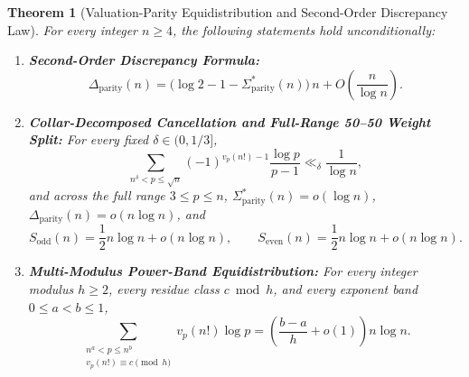 \documentclass[11pt,reqno]{amsart}
\newtheorem{theorem}{Theorem}[section]
\theoremstyle{remark}
\numberwithin{equation}{section}
\newcommand{\Sodd}{S_{\mathrm{odd}}}
\newcommand{\Seven}{S_{\mathrm{even}}}
\newcommand{\Dparity}{\Delta_{\mathrm{parity}}}
\newcommand{\Sparitys}{\Sigma_{\mathrm{parity}}^*}
\begin{document}
\begin{theorem}[{Valuation-Parity Equidistribution and Second-Order Discrepancy Law}]\label{thm:2.5}
For every integer $n \ge 4$, the following statements hold unconditionally:
\begin{enumerate}
\item[(i)] \textbf{Second-Order Discrepancy Formula:}
\begin{equation}\label{eq:2.15}
\Dparity(n) = \bigl(\log 2 - 1 - \Sparitys(n)\bigr)\,n + O\!\left(\frac{n}{\log n}\right).
\end{equation}
\item[(ii)] \textbf{Collar-Decomposed Cancellation and Full-Range 50--50 Weight Split:} For every fixed $\delta \in (0, 1/3]$,
\begin{equation}\label{eq:2.16}
\sum_{n^\delta < p \le \sqrt{n}} (-1)^{v_p(n!)-1} \frac{\log p}{p - 1} \ll_\delta \frac{1}{\log n},
\end{equation}
and across the full range $3 \le p \le n$, $\Sparitys(n) = o(\log n)$, $\Dparity(n) = o(n\log n)$, and
\begin{equation}\label{eq:2.17}
\Sodd(n) = \frac{1}{2}n\log n + o(n\log n), \qquad \Seven(n) = \frac{1}{2}n\log n + o(n\log n).
\end{equation}
\item[(iii)] \textbf{Multi-Modulus Power-Band Equidistribution:} For every integer modulus $h \ge 2$, every residue class $c \bmod h$, and every exponent band $0 \le a < b \le 1$,
\begin{equation}\label{eq:2.18}
\sum_{\substack{n^a < p \le n^b \\ v_p(n!) \equiv c \pmod h}} v_p(n!)\log p = \left(\frac{b - a}{h} + o(1)\right)n\log n.
\end{equation}
\end{enumerate}
\end{theorem}
\end{document}
